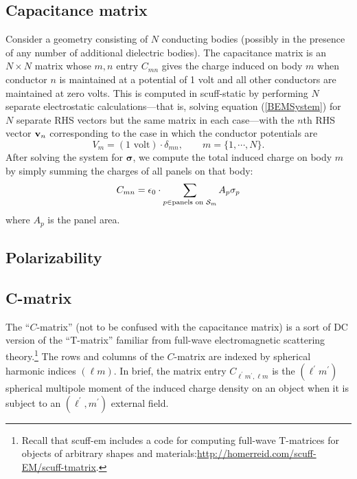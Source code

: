 \documentclass[letterpaper]{article}
\newcommand{\vbsigma}{\boldsymbol{\sigma}}
\begin{document}
\subsection{Capacitance matrix}

Consider a geometry consisting of $N$ conducting bodies
(possibly in the presence of any number of additional
dielectric bodies). The capacitance matrix is an $N\times N$
matrix whose $m,n$ entry $C_{mn}$ gives the charge 
induced on body $m$ when conductor $n$ is maintained at 
a potential of 1 volt and all other conductors are maintained
at zero volts. This is computed in {\sc scuff-static}
by performing $N$ separate electrostatic calculations---that 
is, solving equation (\ref{BEMSystem}) for $N$ separate RHS 
vectors but the same matrix in each case---with the 
$n$th RHS vector $\mathbf{v}_n$ corresponding to the case 
in which the conductor potentials are 
$$V_m = (1\text{ volt})\cdot \delta_{mn}, \qquad 
  m=\{1,\cdots,N\}.$$
After solving the system for $\vbsigma$,
we compute the total induced charge on body $m$ by 
simply summing the charges of all panels on that body:
$$ C_{mn} 
   = 
   \epsilon_0 \cdot \sum_{p\in \text{panels on $\mathcal{S}_m$}} A_p \sigma_p 
$$
where $A_p$ is the panel area.

\subsection{Polarizability}

\subsection{C-matrix}

The ``$C$-matrix'' (not to be confused with the capacitance
matrix) is a sort of DC version of the ``T-matrix'' familiar
from full-wave electromagnetic scattering 
theory.\footnote{Recall that {\sc scuff-em} includes a code
for computing full-wave T-matrices for objects of arbitrary 
shapes and materials:\url{http://homerreid.com/scuff-EM/scuff-tmatrix}.}
The rows and columns of the $C$-matrix are indexed by 
spherical harmonic indices $(\ell m)$. In brief, the matrix entry 
$C_{\ell^\prime m^\prime, \ell m}$ is the $(\ell^\prime m^\prime)$
spherical multipole moment of the induced charge density on an 
object when it is subject to an $(\ell^\prime, m^\prime)$
external field.
\end{document}
